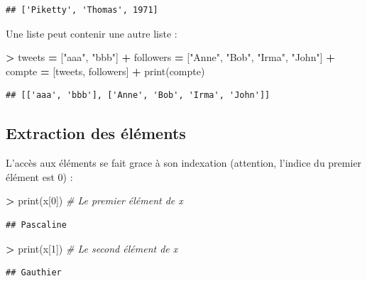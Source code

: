 \documentclass[12pt,]{book}
\newenvironment{Shaded}{\begin{snugshade}}{\end{snugshade}}
\newcommand{\DecValTok}[1]{\textcolor[rgb]{0.00,0.00,0.81}{#1}}
\newcommand{\StringTok}[1]{\textcolor[rgb]{0.31,0.60,0.02}{#1}}
\newcommand{\CommentTok}[1]{\textcolor[rgb]{0.56,0.35,0.01}{\textit{#1}}}
\newcommand{\OperatorTok}[1]{\textcolor[rgb]{0.81,0.36,0.00}{\textbf{#1}}}
\newcommand{\BuiltInTok}[1]{#1}
\newcommand{\NormalTok}[1]{#1}
\numberwithin{equation}{section}
\numberwithin{countremarque}{section}
\begin{document}
\begin{lstlisting}
## ['Piketty', 'Thomas', 1971]
\end{lstlisting}

Une liste peut contenir une autre liste :

\begin{Shaded}
\begin{Highlighting}[]
\OperatorTok{>}\NormalTok{ tweets }\OperatorTok{=}\NormalTok{ [}\StringTok{"aaa"}\NormalTok{, }\StringTok{"bbb"}\NormalTok{]}
\OperatorTok{+}\NormalTok{ followers }\OperatorTok{=}\NormalTok{ [}\StringTok{"Anne"}\NormalTok{, }\StringTok{"Bob"}\NormalTok{, }\StringTok{"Irma"}\NormalTok{, }\StringTok{"John"}\NormalTok{]}
\OperatorTok{+}\NormalTok{ compte }\OperatorTok{=}\NormalTok{ [tweets, followers]}
\OperatorTok{+} \BuiltInTok{print}\NormalTok{(compte)}
\end{Highlighting}
\end{Shaded}

\begin{lstlisting}
## [['aaa', 'bbb'], ['Anne', 'Bob', 'Irma', 'John']]
\end{lstlisting}

\subsection{Extraction des éléments}\label{stucture-liste-extraction}

L'accès aux éléments se fait grace à son indexation (attention, l'indice
du premier élément est 0) :

\begin{Shaded}
\begin{Highlighting}[]
\OperatorTok{>} \BuiltInTok{print}\NormalTok{(x[}\DecValTok{0}\NormalTok{]) }\CommentTok{# Le premier élément de x}
\end{Highlighting}
\end{Shaded}

\begin{lstlisting}
## Pascaline
\end{lstlisting}

\begin{Shaded}
\begin{Highlighting}[]
\OperatorTok{>} \BuiltInTok{print}\NormalTok{(x[}\DecValTok{1}\NormalTok{]) }\CommentTok{# Le second élément de x}
\end{Highlighting}
\end{Shaded}

\begin{lstlisting}
## Gauthier
\end{lstlisting}
\end{document}
